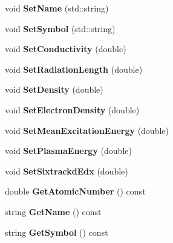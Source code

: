 \begin{DoxyCompactItemize}
void {\bfseries Set\+Name} (std\+::string)
\item 
\mbox{\label{classCompositeMaterial_aaa63c9b0d2aef14512e695d2460add6c}} 
void {\bfseries Set\+Symbol} (std\+::string)
\item 
\mbox{\label{classCompositeMaterial_a0dbd53004231422ac9cc2d6bafb93370}} 
void {\bfseries Set\+Conductivity} (double)
\item 
\mbox{\label{classCompositeMaterial_a61b3fd305750da332b7419f4b2dc6c44}} 
void {\bfseries Set\+Radiation\+Length} (double)
\item 
\mbox{\label{classCompositeMaterial_aefa4007dfb9dd5bc83bbfa1cf4ab16ce}} 
void {\bfseries Set\+Density} (double)
\item 
\mbox{\label{classCompositeMaterial_a044aef4bffa4067fe9f0053aee51f91b}} 
void {\bfseries Set\+Electron\+Density} (double)
\item 
\mbox{\label{classCompositeMaterial_acc7aa25ad845eeee1d11328ed4a29b2a}} 
void {\bfseries Set\+Mean\+Excitation\+Energy} (double)
\item 
\mbox{\label{classCompositeMaterial_a5185762d0b0925ef56b33b51815027b1}} 
void {\bfseries Set\+Plasma\+Energy} (double)
\item 
\mbox{\label{classCompositeMaterial_aa8fb62d02d6994a16423c83b4a5180b6}} 
void {\bfseries Set\+Sixtrackd\+Edx} (double)
\item 
\mbox{\label{classCompositeMaterial_a614ea5d77a2df4cd63553b15852becfa}} 
double {\bfseries Get\+Atomic\+Number} () const
\item 
\mbox{\label{classCompositeMaterial_ae0ad2dbd3a5f0a6f30d61046ffff0871}} 
string {\bfseries Get\+Name} () const
\item 
\mbox{\label{classCompositeMaterial_a96b066d69fba2729228e27af9f19449a}} 
string {\bfseries Get\+Symbol} () const

\end{DoxyCompactItemize}
